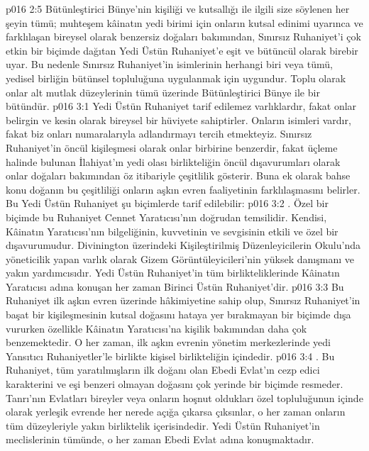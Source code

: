 \vs p016 2:5 Bütünleştirici Bünye’nin kişiliği ve kutsallığı ile ilgili size söylenen her şeyin tümü; muhteşem kâinatın yedi birimi için onların kutsal edinimi uyarınca ve farklılaşan bireysel olarak benzersiz doğaları bakımından, Sınırsız Ruhaniyet’i çok etkin bir biçimde dağıtan Yedi Üstün Ruhaniyet’e eşit ve bütüncül olarak birebir uyar. Bu nedenle Sınırsız Ruhaniyet’in isimlerinin herhangi biri veya tümü, yedisel birliğin bütünsel topluluğuna uygulanmak için uygundur. Toplu olarak onlar alt mutlak düzeylerinin tümü üzerinde Bütünleştirici Bünye ile bir bütündür.
\vs p016 3:1 Yedi Üstün Ruhaniyet tarif edilemez varlıklardır, fakat onlar belirgin ve kesin olarak bireysel bir hüviyete sahiptirler. Onların isimleri vardır, fakat biz onları numaralarıyla adlandırmayı tercih etmekteyiz. Sınırsız Ruhaniyet’in öncül kişileşmesi olarak onlar birbirine benzerdir, fakat üçleme halinde bulunan İlahiyat’ın yedi olası birlikteliğin öncül dışavurumları olarak onlar doğaları bakımından öz itibariyle çeşitlilik gösterir. Buna ek olarak bahse konu doğanın bu çeşitliliği onların aşkın evren faaliyetinin farklılaşmasını belirler. Bu Yedi Üstün Ruhaniyet şu biçimlerde tarif edilebilir:
\vs p016 3:2 . Özel bir biçimde bu Ruhaniyet Cennet Yaratıcısı’nın doğrudan temsilidir. Kendisi, Kâinatın Yaratıcısı’nın bilgeliğinin, kuvvetinin ve sevgisinin etkili ve özel bir dışavurumudur. Divinington üzerindeki Kişileştirilmiş Düzenleyicilerin Okulu’nda yöneticilik yapan varlık olarak Gizem Görüntüleyicileri’nin yüksek danışmanı ve yakın yardımcısıdır. Yedi Üstün Ruhaniyet’in tüm birlikteliklerinde Kâinatın Yaratıcısı adına konuşan her zaman Birinci Üstün Ruhaniyet’dir.
\vs p016 3:3 Bu Ruhaniyet ilk aşkın evren üzerinde hâkimiyetine sahip olup, Sınırsız Ruhaniyet’in başat bir kişileşmesinin kutsal doğasını hataya yer bırakmayan bir biçimde dışa vururken özellikle Kâinatın Yaratıcısı’na kişilik bakımından daha çok benzemektedir. O her zaman, ilk aşkın evrenin yönetim merkezlerinde yedi Yansıtıcı Ruhaniyetler’le birlikte kişisel birlikteliğin içindedir.
\vs p016 3:4 . Bu Ruhaniyet, tüm yaratılmışların ilk doğanı olan Ebedi Evlat’ın cezp edici karakterini ve eşi benzeri olmayan doğasını çok yerinde bir biçimde resmeder. Tanrı'nın Evlatları bireyler veya onların hoşnut oldukları özel topluluğunun içinde olarak yerleşik evrende her nerede açığa çıkarsa çıksınlar, o her zaman onların tüm düzeyleriyle yakın birliktelik içerisindedir. Yedi Üstün Ruhaniyet’in meclislerinin tümünde, o her zaman Ebedi Evlat adına konuşmaktadır.
